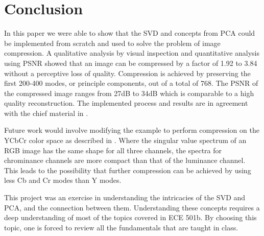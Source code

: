\documentclass[conference]{IEEEtran}
\begin{document}
    \section{Conclusion}

    In this paper we were able to show that the SVD and concepts from PCA could be implemented from scratch and used to solve the problem of image compression. A qualitative analysis by visual inspection and quantitative analysis using PSNR showed that an image can be compressed by a factor of 1.92 to 3.84 without a perceptive loss of quality. Compression is achieved by preserving the first 200-400 modes, or principle components, out of a total of 768. The PSNR of the compressed image ranges from 27dB to 34dB which is comparable to a high quality reconstruction. The implemented process and results are in agreement with the chief material in \cite{jaradet_svd_image_compression}.
    
    Future work would involve modifying the example to perform compression on the YCbCr color space as described in \cite{xu_color_conversion}. Where the singular value spectrum of an RGB image has the same shape for all three channels, the spectra for chrominance channels are more compact than that of the luminance channel. This leads to the possibility that further compression can be achieved by using less Cb and Cr modes than Y modes.

    This project was an exercise in understanding the intricacies of the SVD and PCA, and the connection between them. Understanding these concepts requires a deep understanding of most of the topics covered in ECE 501b. By choosing this topic, one is forced to review all the fundamentals that are taught in class.


    \nocite{jaradet_svd_image_compression}
    \nocite{shlens_2014_tutorial}
    \nocite{omar_image_compression}
    \nocite{xu_color_conversion}
    {}
    
\end{document}
